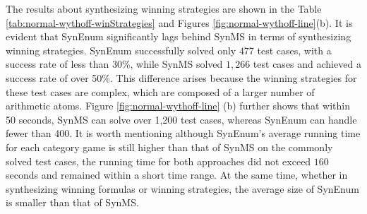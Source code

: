 \documentclass[review]{elsarticle}
\begin{document}
The results about synthesizing winning strategies are shown in
the Table \ref{tab:normal-wythoff-winStrategies} and Figures \ref{fig:normal-wythoff-line}(b). 
It is evident that SynEnum significantly lags behind SynMS in terms of synthesizing winning strategies. SynEnum successfully solved only $477$ test cases, with a success rate of less than 30\%, while SynMS solved $1,266$ test cases and achieved a success rate of over 50\%. This difference arises because the winning strategies for these test cases are complex, which are composed of a larger number of arithmetic atoms. Figure \ref{fig:normal-wythoff-line} (b) further shows that within 50 seconds, SynMS can solve over 1,200 test cases, whereas SynEnum can handle fewer than 400. It is worth mentioning although SynEnum’s average running time for each category game is still higher than that of SynMS on the commonly solved test cases, the running time for both approaches did not exceed $160$ seconds and remained within a short time range. At the same time, whether in synthesizing winning formulas or winning strategies, the average size of SynEnum is smaller than that of SynMS.
\end{document}
